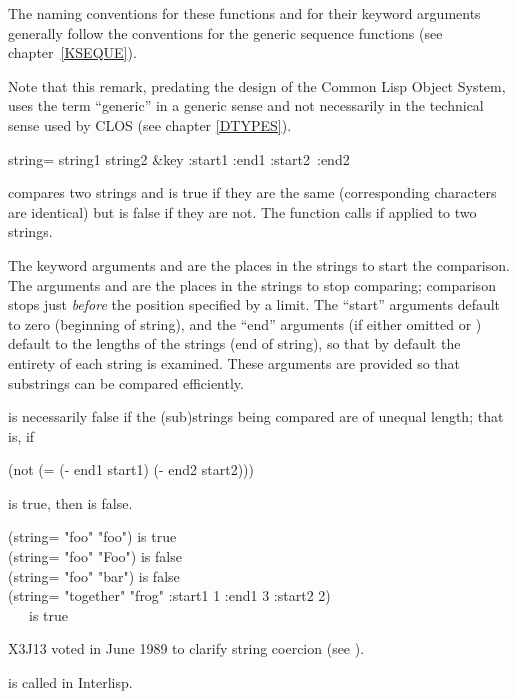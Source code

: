 The naming conventions for these functions and for their keyword
arguments generally follow the conventions for the generic sequence
functions (see chapter~\ref{KSEQUE}).

\begin{new}
Note that this remark, predating the design of the Common Lisp Object System,
uses the term ``generic'' in a generic sense and not necessarily
in the technical sense used by CLOS
(see chapter \ref{DTYPES}).
\end{new}

\begin{defun}[Function]
string= string1 string2 &key :start1 :end1 :start2~:end2

 compares two strings and is true if
they are the same (corresponding characters are identical)
but is false if they are not.
The function  calls  if
applied to two strings.

The keyword arguments  and  are the places
in the strings to start the comparison.
The arguments  and  are the
places in the strings to stop comparing; comparison stops just
\emph{before} the position specified by a limit.
The ``start'' arguments default to zero (beginning of string),
and the ``end'' arguments (if either omitted or {\false})
default to the lengths of the strings (end of string),
so that by default the entirety of each string is examined.
These arguments are provided so that substrings can be compared
efficiently.

 is necessarily false if the (sub)strings
being compared are of unequal length; that is, if
\begin{lisp}
(not (= (- end1 start1) (- end2 start2)))
\end{lisp}
is true, then  is false.

\begin{lisp}
(string= "foo" "foo") \textrm{is true} \\
(string= "foo" "Foo") \textrm{is false} \\
(string= "foo" "bar") \textrm{is false} \\
(string= "together" "frog" :start1 1 :end1 3 :start2 2) \\
~~~\textrm{is true}
\end{lisp}

\begin{newer}
X3J13 voted in June 1989 
to clarify string coercion (see ).
\end{newer}

\beforenoterule
\begin{incompatibility}
 is called  in Interlisp.
\end{incompatibility}
\afternoterule
\end{defun}

